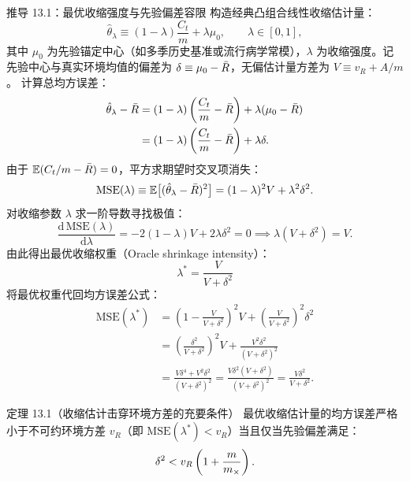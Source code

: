 \begin{derivationbox}{推导 13.1：最优收缩强度与先验偏差容限}
构造经典凸组合线性收缩估计量：
\begin{equation}
  \hat{\theta}_\lambda \equiv (1 - \lambda) \frac{C_t}{m} + \lambda \mu_0, \qquad \lambda \in [0, 1],
  \label{eq:shrink-def}
\end{equation}
其中 $\mu_0$ 为先验锚定中心（如多季历史基准或流行病学常模），$\lambda$ 为收缩强度。记先验中心与真实环境均值的偏差为 $\delta \equiv \mu_0 - \bar{R}$，无偏估计量方差为 $V \equiv v_R + A/m$。
计算总均方误差：
\begin{align}
  \hat{\theta}_\lambda - \bar{R} &= (1 - \lambda)\left( \frac{C_t}{m} - \bar{R} \right) + \lambda(\mu_0 - \bar{R}) \nonumber \\
  &= (1 - \lambda)\left( \frac{C_t}{m} - \bar{R} \right) + \lambda \delta.
\end{align}
由于 $\mathbb{E}(C_t/m - \bar{R}) = 0$，平方求期望时交叉项消失：
\begin{equation}
  \text{MSE}(\lambda) \equiv \mathbb{E}\big[(\hat{\theta}_\lambda - \bar{R})^2\big] = (1 - \lambda)^2 V + \lambda^2 \delta^2.
\end{equation}
对收缩参数 $\lambda$ 求一阶导数寻找极值：
\begin{equation}
  \frac{\mathrm{d}\,\text{MSE}(\lambda)}{\mathrm{d}\lambda} = -2(1 - \lambda)V + 2\lambda \delta^2 = 0 \implies \lambda(V + \delta^2) = V.
\end{equation}
由此得出最优收缩权重（Oracle shrinkage intensity）：
\begin{equation}
  \boxed{\, \lambda^* = \frac{V}{V + \delta^2} \,}
  \label{eq:opt-lambda}
\end{equation}
将最优权重代回均方误差公式：
\begin{align}
  \text{MSE}(\lambda^*) &= \left( 1 - \frac{V}{V+\delta^2} \right)^2 V + \left( \frac{V}{V+\delta^2} \right)^2 \delta^2 \nonumber \\
  &= \left( \frac{\delta^2}{V+\delta^2} \right)^2 V + \frac{V^2 \delta^2}{(V+\delta^2)^2} \nonumber \\
  &= \frac{V \delta^4 + V^2 \delta^2}{(V+\delta^2)^2} = \frac{V \delta^2 (V + \delta^2)}{(V+\delta^2)^2} = \frac{V \delta^2}{V + \delta^2}.
  \label{eq:opt-mse-shrink}
\end{align}
\end{derivationbox}

\begin{theorembox}{定理 13.1（收缩估计击穿环境方差的充要条件）}
最优收缩估计量的均方误差严格小于不可约环境方差 $v_R$（即 $\text{MSE}(\lambda^*) < v_R$）当且仅当先验偏差满足：
\begin{equation}
  \delta^2 < v_R \left( 1 + \frac{m}{m_\times} \right).
  \label{eq:shrink-barrier}
\end{equation}
\end{theorembox}

